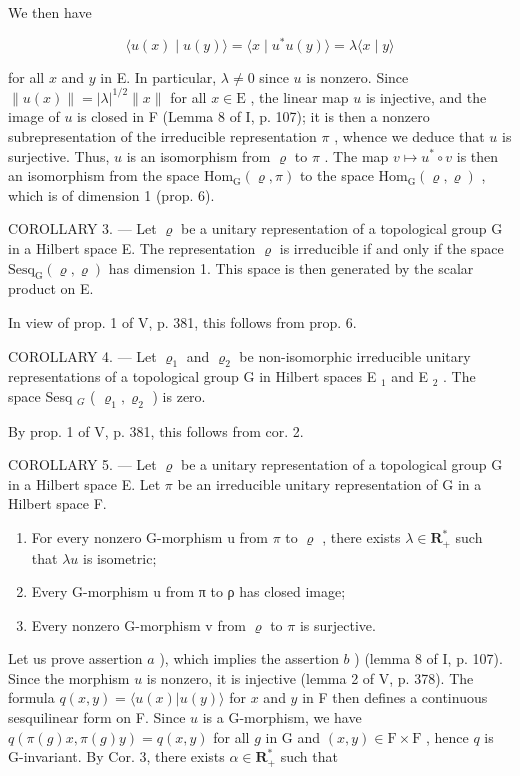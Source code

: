 We then have

\[
\langle u (x) \mid u (y) \rangle = \langle x \mid u ^ {*} u (y) \rangle = \lambda \langle x \mid y \rangle
\]

for all \(x\) and \(y\) in E. In particular, \(\lambda \neq 0\) since \(u\) is nonzero. Since \(\| u(x)\| = |\lambda |^{1 / 2}\| x\|\) for all \(x\in \mathrm{E}\) , the linear map \(u\) is injective, and the image of \(u\) is closed in F (Lemma 8 of I, p. 107); it is then a nonzero subrepresentation of the irreducible representation \(\pi\) , whence we deduce that \(u\) is surjective. Thus, \(u\) is an isomorphism from \(\varrho\) to \(\pi\) . The map \(v\mapsto u^{*}\circ v\) is then an isomorphism from the space \(\mathrm{Hom}_{\mathrm{G}}(\varrho ,\pi)\) to the space \(\mathrm{Hom}_{\mathrm{G}}(\varrho ,\varrho)\) , which is of dimension 1 (prop. 6).

COROLLARY 3. --- Let \(\varrho\) be a unitary representation of a topological group G in a Hilbert space E. The representation \(\varrho\) is irreducible if and only if the space \(\mathrm{Sesq}_{\mathrm{G}}(\varrho, \varrho)\) has dimension 1. This space is then generated by the scalar product on E.

In view of prop. 1 of V, p. 381, this follows from prop. 6.

COROLLARY 4. --- Let \(\varrho_{1}\) and \(\varrho_{2}\) be non-isomorphic irreducible unitary representations of a topological group G in Hilbert spaces E \(_{1}\) and E \(_{2}\) . The space Sesq \(_{G}\) ( \(\varrho_{1}, \varrho_{2}\) ) is zero.

By prop. 1 of V, p. 381, this follows from cor. 2.

COROLLARY 5. --- Let \(\varrho\) be a unitary representation of a topological group G in a Hilbert space E. Let \(\pi\) be an irreducible unitary representation of G in a Hilbert space F.

\begin{enumerate}
\def\labelenumi{\alph{enumi})}
\item
  For every nonzero G-morphism u from \(\pi\) to \(\varrho\) , there exists \(\lambda \in \mathbf{R}_{+}^{*}\) such that \(\lambda u\) is isometric;
\item
  Every G-morphism u from π to ρ has closed image;
\item
  Every nonzero G-morphism v from \(\varrho\) to \(\pi\) is surjective.
\end{enumerate}

Let us prove assertion \(a\) ), which implies the assertion \(b\) ) (lemma 8 of I, p. 107). Since the morphism \(u\) is nonzero, it is injective (lemma 2 of V, p. 378). The formula \(q(x,y) = \langle u(x)|u(y)\rangle\) for \(x\) and \(y\) in F then defines a continuous sesquilinear form on F. Since \(u\) is a G-morphism, we have \(q(\pi(g)x,\pi(g)y) = q(x,y)\) for all \(g\) in G and \((x,y)\in\mathrm{F}\times\mathrm{F}\) , hence \(q\) is G-invariant. By Cor. 3, there exists \(\alpha\in\mathbf{R}_{+}^{*}\) such that

